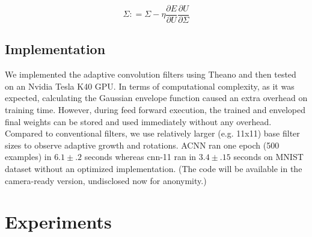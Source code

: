 \documentclass{bmvc2k}
\begin{document}
\begin{equation}
\label{eq:derivesigma}
\Sigma \mathrel{{:}{=}} \Sigma - \eta \frac{\partial E}{\partial U} \frac{\partial U}{\partial \Sigma}
\end{equation}






\subsection{Implementation}

We implemented the adaptive convolution filters using Theano \cite{theano} and then tested on an Nvidia Tesla K40 GPU. In terms of computational complexity, as it was expected, calculating the Gaussian envelope function caused an extra overhead on training time. However, during feed forward execution, the trained and enveloped final weights can be stored and used immediately without any overhead. Compared to conventional filters, we use relatively larger (e.g. 11x11) base filter sizes to observe adaptive growth and rotations. ACNN ran one epoch (500 examples) in $6.1 \pm .2$ seconds whereas cnn-11 ran in $3.4 \pm .15$ seconds on MNIST dataset without an optimized implementation. (The code will be available in the camera-ready version, undisclosed now for anonymity.)

\section{Experiments}
\label{sec:experiments}
\end{document}
